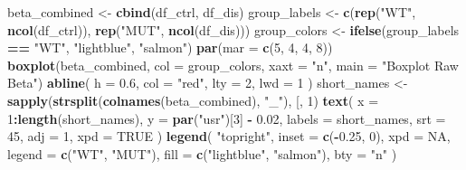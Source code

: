 \documentclass[
]{article}
\newenvironment{Shaded}{\begin{snugshade}}{\end{snugshade}}
\newcommand{\AttributeTok}[1]{\textcolor[rgb]{0.13,0.29,0.53}{#1}}
\newcommand{\ConstantTok}[1]{\textcolor[rgb]{0.56,0.35,0.01}{#1}}
\newcommand{\DecValTok}[1]{\textcolor[rgb]{0.00,0.00,0.81}{#1}}
\newcommand{\FloatTok}[1]{\textcolor[rgb]{0.00,0.00,0.81}{#1}}
\newcommand{\FunctionTok}[1]{\textcolor[rgb]{0.13,0.29,0.53}{\textbf{#1}}}
\newcommand{\NormalTok}[1]{#1}
\newcommand{\OtherTok}[1]{\textcolor[rgb]{0.56,0.35,0.01}{#1}}
\newcommand{\SpecialCharTok}[1]{\textcolor[rgb]{0.81,0.36,0.00}{\textbf{#1}}}
\newcommand{\StringTok}[1]{\textcolor[rgb]{0.31,0.60,0.02}{#1}}
\begin{document}
\begin{Shaded}
\begin{Highlighting}[]
\NormalTok{beta\_combined }\OtherTok{\textless{}{-}} \FunctionTok{cbind}\NormalTok{(df\_ctrl, df\_dis)}
\NormalTok{group\_labels }\OtherTok{\textless{}{-}} \FunctionTok{c}\NormalTok{(}\FunctionTok{rep}\NormalTok{(}\StringTok{"WT"}\NormalTok{, }\FunctionTok{ncol}\NormalTok{(df\_ctrl)), }\FunctionTok{rep}\NormalTok{(}\StringTok{"MUT"}\NormalTok{, }\FunctionTok{ncol}\NormalTok{(df\_dis)))}
\NormalTok{group\_colors }\OtherTok{\textless{}{-}} \FunctionTok{ifelse}\NormalTok{(group\_labels }\SpecialCharTok{==} \StringTok{"WT"}\NormalTok{, }\StringTok{"lightblue"}\NormalTok{, }\StringTok{"salmon"}\NormalTok{)}
\FunctionTok{par}\NormalTok{(}\AttributeTok{mar =} \FunctionTok{c}\NormalTok{(}\DecValTok{5}\NormalTok{, }\DecValTok{4}\NormalTok{, }\DecValTok{4}\NormalTok{, }\DecValTok{8}\NormalTok{))}
\FunctionTok{boxplot}\NormalTok{(beta\_combined,}
        \AttributeTok{col =}\NormalTok{ group\_colors,}
        \AttributeTok{xaxt =} \StringTok{"n"}\NormalTok{,}
        \AttributeTok{main =} \StringTok{"Boxplot Raw Beta"}\NormalTok{)}
\FunctionTok{abline}\NormalTok{(}
  \AttributeTok{h =} \FloatTok{0.6}\NormalTok{,}
  \AttributeTok{col =} \StringTok{"red"}\NormalTok{,}
  \AttributeTok{lty =} \DecValTok{2}\NormalTok{,}
  \AttributeTok{lwd =} \DecValTok{1}
\NormalTok{)}
\NormalTok{short\_names }\OtherTok{\textless{}{-}} \FunctionTok{sapply}\NormalTok{(}\FunctionTok{strsplit}\NormalTok{(}\FunctionTok{colnames}\NormalTok{(beta\_combined), }\StringTok{"\_"}\NormalTok{), }\StringTok{\textasciigrave{}}\AttributeTok{[}\StringTok{\textasciigrave{}}\NormalTok{, }\DecValTok{1}\NormalTok{)}
\FunctionTok{text}\NormalTok{(}
  \AttributeTok{x =} \DecValTok{1}\SpecialCharTok{:}\FunctionTok{length}\NormalTok{(short\_names),}
  \AttributeTok{y =} \FunctionTok{par}\NormalTok{(}\StringTok{"usr"}\NormalTok{)[}\DecValTok{3}\NormalTok{] }\SpecialCharTok{{-}} \FloatTok{0.02}\NormalTok{,}
  \AttributeTok{labels =}\NormalTok{ short\_names,}
  \AttributeTok{srt =} \DecValTok{45}\NormalTok{,}
  \AttributeTok{adj =} \DecValTok{1}\NormalTok{,}
  \AttributeTok{xpd =} \ConstantTok{TRUE}
\NormalTok{)}
\FunctionTok{legend}\NormalTok{(}
  \StringTok{"topright"}\NormalTok{,}
  \AttributeTok{inset =} \FunctionTok{c}\NormalTok{(}\SpecialCharTok{{-}}\FloatTok{0.25}\NormalTok{, }\DecValTok{0}\NormalTok{),}
  \AttributeTok{xpd =} \ConstantTok{NA}\NormalTok{,}
  \AttributeTok{legend =} \FunctionTok{c}\NormalTok{(}\StringTok{"WT"}\NormalTok{, }\StringTok{"MUT"}\NormalTok{),}
  \AttributeTok{fill =} \FunctionTok{c}\NormalTok{(}\StringTok{"lightblue"}\NormalTok{, }\StringTok{"salmon"}\NormalTok{),}
  \AttributeTok{bty =} \StringTok{"n"}
\NormalTok{)}


\end{Highlighting}
\end{Shaded}
\end{document}
